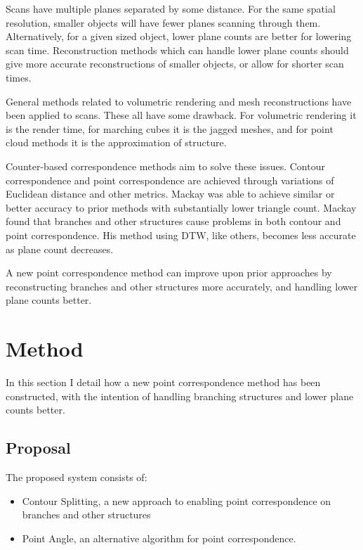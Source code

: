\documentclass[11p, titlepage]{article}
\begin{document}
Scans have multiple planes separated by some distance. For the same spatial resolution, smaller objects will have fewer planes scanning through them. Alternatively, for a given sized object, lower plane counts are better for lowering scan time. Reconstruction methods which can handle lower plane counts should give more accurate reconstructions of smaller objects, or allow for shorter scan times.

General methods related to volumetric rendering and mesh reconstructions have been applied to scans. These all have some drawback. For volumetric rendering it is the render time, for marching cubes it is the jagged meshes, and for point cloud methods it is the approximation of structure.

Counter-based correspondence methods aim to solve these issues. Contour correspondence and point correspondence are achieved through variations of Euclidean distance and other metrics. Mackay was able to achieve similar or better accuracy to prior methods with substantially lower triangle count. Mackay found that branches and other structures cause problems in both contour and point correspondence. His method using DTW, like others, becomes less accurate as plane count decreases.

A new point correspondence method can improve upon prior approaches by reconstructing branches and other structures more accurately, and handling lower plane counts better.
\pagebreak

\section{Method}

In this section I detail how a new point correspondence method has been constructed, with the intention of handling branching structures and lower plane counts better.

\subsection{Proposal}

The proposed system consists of:
\begin{itemize}
\item Contour Splitting, a new approach to enabling point correspondence on branches and other structures
\item Point Angle, an alternative algorithm for point correspondence.
\end{itemize}
\end{document}
